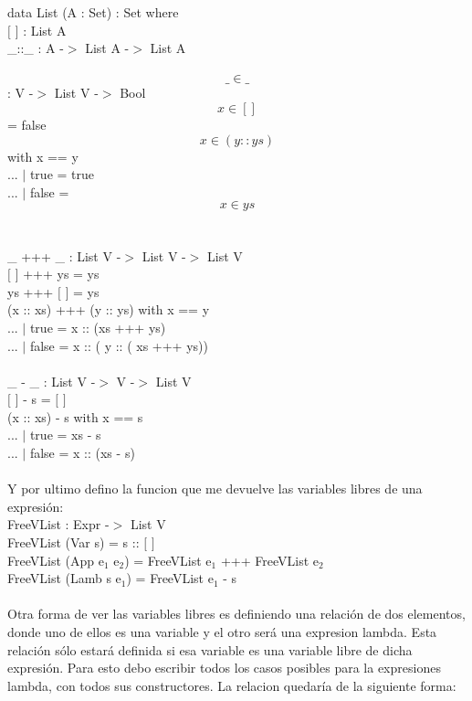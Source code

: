 \documentclass{book}
\begin{document}
data List (A : Set) : Set where \\
 $[$ $]$    : List A \\
 \_::\_  : A -$>$ List A -$>$ List A \\ \\

 
\[ \_ \in \_ \] : V -$>$ List V -$>$ Bool \\
\[x \in []\] = false \\
\[x \in (y :: ys)\] with x == y \\
... $|$ true = true \\
... $|$ false = \[x \in ys\] \\ \\

\_ +++ \_ : List V -$>$ List V -$>$ List V \\
$[$ $]$        +++ ys = ys \\
ys        +++ $[$ $]$ = ys \\
(x :: xs) +++ (y :: ys) with x == y \\
... $|$ true = x :: (xs +++ ys) \\
... $|$ false = x :: ( y :: ( xs +++ ys)) \\ \\

\_ - \_ : List V -$>$ V -$>$ List V \\
$[$ $]$        - s = $[$ $]$ \\
(x :: xs) - s with x == s \\
... $|$ true = xs - s \\
... $|$ false = x :: (xs - s) \\ \\


Y por ultimo defino la funcion que me devuelve las variables libres de una expresión: \\

FreeVList : Expr -$>$ List V \\
FreeVList (Var s) = s :: $[$ $]$ \\
FreeVList (App e$_{1}$ e$_{2}$) = FreeVList e$_{1}$ +++ FreeVList e$_{2}$ \\
FreeVList (Lamb s e$_{1}$) = FreeVList e$_{1}$ - s \\ \\

Otra forma de ver las variables libres es definiendo una relación de dos elementos, donde uno de ellos es una variable y el otro será una expresion lambda. Esta relación sólo estará definida si esa variable es una variable libre de dicha expresión.
Para esto debo escribir todos los casos posibles para la expresiones lambda, con todos sus constructores. La relacion quedaría de la siguiente forma: \\
\end{document}
